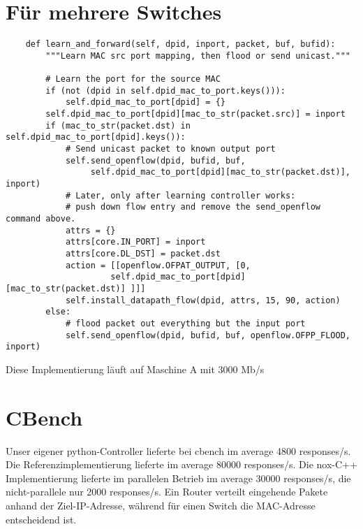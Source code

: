 \documentclass[a4paper,10pt]{scrartcl}
\begin{document}
\section*{Für mehrere Switches}
\begin{verbatim}
    def learn_and_forward(self, dpid, inport, packet, buf, bufid):
        """Learn MAC src port mapping, then flood or send unicast."""

        # Learn the port for the source MAC
        if (not (dpid in self.dpid_mac_to_port.keys())):
            self.dpid_mac_to_port[dpid] = {}
        self.dpid_mac_to_port[dpid][mac_to_str(packet.src)] = inport
        if (mac_to_str(packet.dst) in self.dpid_mac_to_port[dpid].keys()):
            # Send unicast packet to known output port
            self.send_openflow(dpid, bufid, buf, 
                 self.dpid_mac_to_port[dpid][mac_to_str(packet.dst)], inport)
            # Later, only after learning controller works: 
            # push down flow entry and remove the send_openflow command above.
            attrs = {}
            attrs[core.IN_PORT] = inport
            attrs[core.DL_DST] = packet.dst
            action = [[openflow.OFPAT_OUTPUT, [0, 
                     self.dpid_mac_to_port[dpid][mac_to_str(packet.dst)] ]]]
            self.install_datapath_flow(dpid, attrs, 15, 90, action)
        else:
            # flood packet out everything but the input port
            self.send_openflow(dpid, bufid, buf, openflow.OFPP_FLOOD, inport)
\end{verbatim}
  Diese Implementierung läuft auf Maschine A mit 3000 Mb/s

\section*{CBench}
  Unser eigener python-Controller lieferte bei cbench im average 4800 responses/s. Die Referenzimplementierung lieferte im average 80000 responses/s. Die nox-C++ Implementierung lieferte im  parallelen Betrieb im average 30000 responses/s, die nicht-parallele nur 2000 responses/s.
  Ein Router verteilt eingehende Pakete anhand der Ziel-IP-Adresse, während für einen Switch die MAC-Adresse entscheidend ist.
\end{document}
